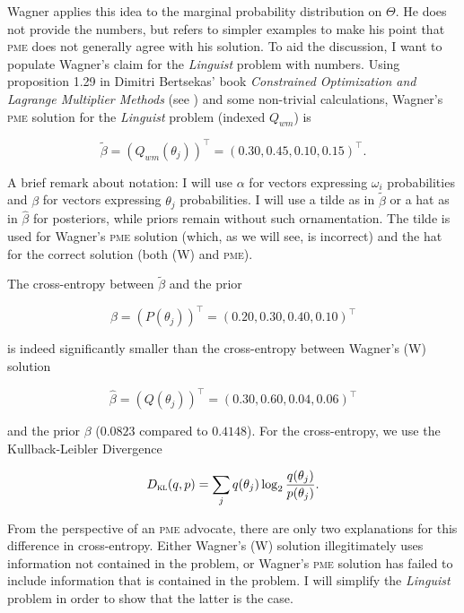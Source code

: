 \documentclass[phd,12pt,oneside]{ubcthesis}
\begin{document}
Wagner applies this idea to the marginal probability distribution on
$\Theta$. He does not provide the numbers, but refers to simpler
examples to make his point that \textsc{pme} does not generally agree with his
solution. To aid the discussion, I want to populate Wagner's claim for
the \emph{Linguist} problem with numbers. Using proposition 1.29 in
Dimitri Bertsekas' book \emph{Constrained Optimization and Lagrange
  Multiplier Methods} (see ) and some
non-trivial calculations, Wagner's \textsc{pme} solution for the
\emph{Linguist} problem (indexed $Q_{wm}$) is

\begin{equation}
  \label{eq:p13}
  \tilde{\beta}=(Q_{wm}(\theta_{j}))^{\intercal}=(0.30,0.45,0.10,0.15)^{\intercal}.
\end{equation}

{\noindent}A brief remark about notation: I will use $\alpha$ for vectors
expressing $\omega_{i}$ probabilities and $\beta$ for vectors
expressing $\theta_{j}$ probabilities. I will use a tilde as in
$\tilde{\beta}$ or a hat as in $\hat{\beta}$ for posteriors, while
priors remain without such ornamentation. The tilde is used for
Wagner's \textsc{pme} solution (which, as we will see, is incorrect) and the
hat for the correct solution (both (W) and \textsc{pme}).

The cross-entropy between $\tilde{\beta}$ and the prior

\begin{equation}
  \label{eq:p14}
  \beta=(P(\theta_{j}))^{\intercal}=(0.20,0.30,0.40,0.10)^{\intercal}
\end{equation}

{\noindent}is indeed significantly smaller than the cross-entropy between
Wagner's (W) solution 

\begin{equation}
  \label{eq:p15}
  \hat{\beta}=(Q(\theta_{j}))^{\intercal}=(0.30,0.60,0.04,0.06)^{\intercal}
\end{equation}

{\noindent}and the prior $\beta$ ($0.0823$ compared to $0.4148$). For the
cross-entropy, we use the Kullback-Leibler Divergence

\begin{equation}
  \label{eq:kl}
  D_{\textsc{kl}}(q,p)=\sum_{j}q(\theta_{j})\log_{2}\frac{q(\theta_{j})}{p(\theta_{j})}.
\end{equation}

From the perspective of an \textsc{pme} advocate, there are only two
explanations for this difference in cross-entropy. Either Wagner's (W)
solution illegitimately uses information not contained in the problem,
or Wagner's \textsc{pme} solution has failed to include information that is
contained in the problem. I will simplify the \emph{Linguist} problem
in order to show that the latter is the case.
\end{document}
